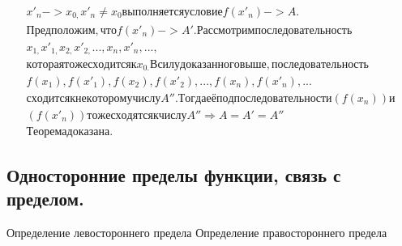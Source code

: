 \documentclass[a4paper]{article}
\begin{document}
\begin{equation*}
\begin{gathered}
x'_n->x_{0,}x'_n\neq
x_0\mathit{\text{в}\text{ы}\text{п}\text{о}\text{л}\text{н}\text{я}\text{е}\text{т}\text{с}\text{я}}\mathit{\text{у}\text{с}\text{л}\text{о}\text{в}\text{и}\text{е}}f(x'_n)->\mathit{A.}\\\mathit{\text{П}\text{р}\text{е}\text{д}\text{п}\text{о}\text{л}\text{о}\text{ж}\text{и}\text{м}},\mathit{\text{ч}\text{т}\text{о}}f(x'_n)->A'.\mathit{\text{Р}\text{а}\text{с}\text{с}\text{м}\text{о}\text{т}\text{р}\text{и}\text{м}}\mathit{\text{п}\text{о}\text{с}\text{л}\text{е}\text{д}\text{о}\text{в}\text{а}\text{т}\text{е}\text{л}\text{ь}\text{н}\text{о}\text{с}\text{т}\text{ь}}\\x_{1,}x'_{1,}x_{2,}x'_{2,}...,x_n,x'_n,...,\\\mathit{\text{к}\text{о}\text{т}\text{о}\text{р}\text{а}\text{я}}\mathit{\text{т}\text{о}\text{ж}\text{е}}\mathit{\text{с}\text{х}\text{о}\text{д}\text{и}\text{т}\text{с}\text{я}}\text{к}x_{0.}\text{В}\mathit{\text{с}\text{и}\text{л}\text{у}}\mathit{\text{д}\text{о}\text{к}\text{а}\text{з}\text{а}\text{н}\text{н}\text{о}\text{г}\text{о}}\mathit{\text{в}\text{ы}\text{ш}\text{е}},\mathit{\text{п}\text{о}\text{с}\text{л}\text{е}\text{д}\text{о}\text{в}\text{а}\text{т}\text{е}\text{л}\text{ь}\text{н}\text{о}\text{с}\text{т}\text{ь}}\\f(x_1),f(x'_1),f(x_2),f(x'_2),...,f(x_n),f(x'_n),...\\\mathit{\text{с}\text{х}\text{о}\text{д}\text{и}\text{т}\text{с}\text{я}}\text{к}\mathit{\text{н}\text{е}\text{к}\text{о}\text{т}\text{о}\text{р}\text{о}\text{м}\text{у}}\mathit{\text{ч}\text{и}\text{с}\text{л}\text{у}}A''.\mathit{\text{Т}\text{о}\text{г}\text{д}\text{а}}\mathit{\text{е}\text{ё}}\mathit{\text{п}\text{о}\text{д}\text{п}\text{о}\text{с}\text{л}\text{е}\text{д}\text{о}\text{в}\text{а}\text{т}\text{е}\text{л}\text{ь}\text{н}\text{о}\text{с}\text{т}\text{и}}(f(x_n))\text{и}\\(f(x'_n))\mathit{\text{т}\text{о}\text{ж}\text{е}}\mathit{\text{с}\text{х}\text{о}\text{д}\text{я}\text{т}\text{с}\text{я}}\text{к}\mathit{\text{ч}\text{и}\text{с}\text{л}\text{у}}A''\Rightarrow
A=A'=A''\\\mathit{\text{Т}\text{е}\text{о}\text{р}\text{е}\text{м}\text{а}}\mathit{\text{д}\text{о}\text{к}\text{а}\text{з}\text{а}\text{н}\text{а}.}\end{gathered}
\end{equation*}
\subsection{Односторонние пределы функции, связь с пределом.}
Определение левостороннего предела\newline
Определение правостороннего предела
\end{document}
